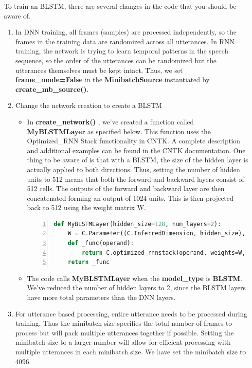 To train an BLSTM, there are several changes in the code that you should be aware of.
\begin{enumerate}
	\item In DNN training, all frames (samples) are processed independently, so the frames in the training data are randomized across all utterances. In RNN training, the network is trying to learn temporal patterns in the speech sequence, so the order of the utterances can be randomized but the utterances themselves must be kept intact. Thus, we set {\bf frame\_mode=False} in the {\bf MinibatchSource} instantiated by {\bf create\_mb\_source()}.
	\item Change the network creation to create a BLSTM
		\begin{itemize}
			\item In {\bf create\_network()} , we've created a function called {\bf MyBLSTMLayer} as specified below. This function uses the Optimized\_RNN Stack functionality in CNTK. A complete description and additional examples can be found in the CNTK documentation. One thing to be aware of is that with a BLSTM, the size of the hidden layer is actually applied to both directions. Thus, setting the number of hidden units to 512 means that both the forward and backward layers consist of 512 cells. The outputs of the forward and backward layer are then concatenated forming an output of 1024 units. This is then projected back to 512 using the weight matrix W.
\begin{lstlisting}[language = python, numbers=left, 
	 numberstyle=\tiny,keywordstyle=\color{blue!70},
	 commentstyle=\color{red!50!green!50!blue!50},frame=shadowbox,
	 rulesepcolor=\color{red!20!green!20!blue!20},basicstyle=\ttfamily]
def MyBLSTMLayer(hidden_size=128, num_layers=2): 
	W = C.Parameter((C.InferredDimension, hidden_size), init=C.he_normal(1.0), name='rnn_parameters') 
	def _func(operand): 
		return C.optimized_rnnstack(operand, weights=W, hidden_size=hidden_size, num_layers=num_layers, bidirectional=True, recurrent_op='lstm') 
	return _func
\end{lstlisting}
			\item The code calls {\bf MyBLSTMLayer} when the {\bf model\_type} is {\bf BLSTM}. We've reduced the number of hidden layers to 2, since the BLSTM layers have more total parameters than the DNN layers.
		\end{itemize}
	\item For utterance based processing, entire utterance needs to be processed during training. Thus the minibatch size specifies the total number of frames to process but will pack multiple utterances together if possible. Setting the minibatch size to a larger number will allow for efficient processing with multiple utterances in each minibatch size. We have set the minibatch size to 4096.
\end{enumerate}

